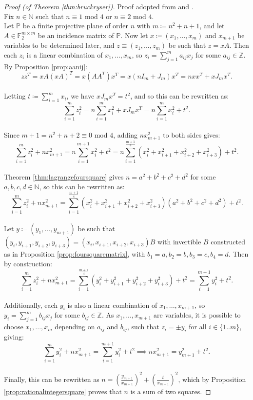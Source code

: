 \documentclass{report}
\newcommand{\N}{\mathbb{N}}
\newcommand{\Z}{\mathbb{Z}}
\newcommand{\F}{\mathbb{F}}
\renewcommand{\P}{\mathbb{P}}
\theoremstyle{definition}\newtheorem*{definition}{Definition}
\theoremstyle{definition}\newtheorem*{example}{Example}
\theoremstyle{remark}\newtheorem*{remark}{Remark}
\begin{document}
\begin{proof}[Proof (of Theorem \ref{thm:bruckryser})]
Proof adopted from \cite{5} and \cite{kahrstrom}. \\
Fix $ n \in \N $ such that $ n \equiv 1 $ mod $ 4 $ or $ n \equiv 2 $ mod $ 4 $. \\
Let $ \P $ be a finite projective plane of order $ n $ with $ m \coloneqq n^2 + n + 1 $, and let $ A \in \F_2^{m \times m} $ be an incidence matrix of $ \P $. Now let $ x \coloneqq (x_1, ..., x_m) $ and $ x_{m + 1} $ be variables to be determined later, and $ z \equiv (z_1, ..., z_m) $ be such that $ z = xA $. Then each $ z_i $ is a linear combination of $ x_1, ..., x_m $, so $ z_i = \sum_{j = 1}^m a_{ij} x_j $ for some $ a_{ij} \in \Z $. \\
By Proposition \ref{prop:aanij}: $$ zz^T = xA (xA)^T = x (AA^T) x^T = x (nI_m + J_m) x^T = nxx^T + xJ_m x^T. $$ \\
Letting $ t \coloneqq \sum_{i = 1}^m x_i $, we have $ x J_m x^T = t^2 $, and so this can be rewritten as: $$ \sum_{i = 1}^m z_i^2 = n \sum_{i = 1}^m x_i^2 + x J_m x^T = n \sum_{i = 1}^m x_i^2 + t^2. $$ \\
Since $ m + 1 = n^2 + n + 2 \equiv 0 $ mod $ 4 $, adding $ nx_{m + 1}^2 $ to both sides gives: $$ \sum_{i = 1}^m z_i^2 + nx_{m + 1}^2 = n \sum_{i = 1}^{m + 1} x_i^2 + t^2 = n \sum_{i = 1}^{\frac{m + 1}{4}} \left( x_i^2 + x_{i + 1}^2 + x_{i + 2}^2 + x_{i + 3}^2 \right) + t^2. $$ \\
Theorem \ref{thm:lagrangefoursquare} gives $ n = a^2 + b^2 + c^2 + d^2 $ for some $ a, b, c, d \in \N $, so this can be rewritten as: $$ \sum_{i = 1}^m z_i^2 + nx_{m + 1}^2 = \sum_{i = 1}^{\frac{m + 1}{4}} \left( x_i^2 + x_{i + 1}^2 + x_{i + 2}^2 + x_{i + 3}^2 \right) (a^2 + b^2 + c^2 + d^2) + t^2. $$ \\
Let $ y \coloneqq (y_1, ..., y_{m + 1}) $ be such that $ (y_i, y_{i + 1}, y_{i + 2}, y_{i + 3}) = (x_i, x_{i + 1}, x_{i + 2}, x_{i + 3})B $ with invertible $ B $ constructed as in Proposition \ref{prop:foursquarematrix}, with $ b_1 = a, b_2 = b, b_3 = c, b_4 = d $. Then by construction: $$ \sum_{i = 1}^m z_i^2 + nx_{m + 1}^2 = \sum_{i = 1}^{\frac{m + 1}{4}} \left( y_i^2 + y_{i + 1}^2 + y_{i + 2}^2 + y_{i + 3}^2 \right) + t^2 = \sum_{i = 1}^{m + 1} y_i^2 + t^2. $$ \\
Additionally, each $ y_i $ is also a linear combination of $ x_1, ..., x_{m + 1} $, so $ y_i = \sum_{j = 1}^m b_{ij} x_j $ for some $ b_{ij} \in \Z $. As $ x_1, ..., x_{m + 1} $ are variables, it is possible to choose $ x_1, ..., x_m $ depending on $ a_{ij} $ and $ b_{ij} $, such that $ z_i = \pm y_i $ for all $ i \in \{ 1 .. m \} $, giving: $$ \sum_{i = 1}^m y_i^2 + nx_{m + 1}^2 = \sum_{i = 1}^{m + 1} y_i^2 + t^2 \implies nx_{m + 1}^2 = y_{m + 1}^2 + t^2. $$ \\
Finally, this can be rewritten as $ n = \left( \frac{y_{m + 1}}{x_{m + 1}} \right)^2 + \left( \frac{t}{x_{m + 1}} \right)^2 $, which by Proposition \ref{prop:rationalintegersquare} proves that $ n $ is a sum of two squares.
\end{proof}
\end{document}
